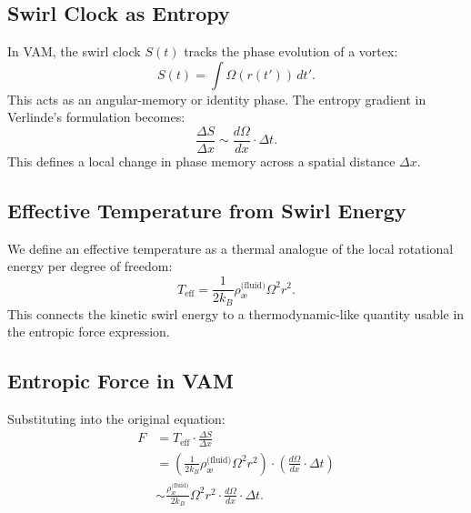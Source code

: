 \documentclass[preprint]{revtex4-2}
\begin{document}
            \subsection{Swirl Clock as Entropy}
            In VAM, the swirl clock $S(t)$ tracks the phase evolution of a vortex:
            \begin{equation}
                S(t) = \int \Omega(r(t'))\, dt'.
            \end{equation}
            This acts as an angular-memory or identity phase. The entropy gradient in Verlinde's formulation becomes:
            \begin{equation}
                \frac{\Delta S}{\Delta x} \sim \frac{d\Omega}{dx} \cdot \Delta t.
            \end{equation}
            This defines a local change in phase memory across a spatial distance $\Delta x$.

            \subsection*{Effective Temperature from Swirl Energy}
            We define an effective temperature as a thermal analogue of the local rotational energy per degree of freedom:
            \begin{equation}
                T_\text{eff} = \frac{1}{2k_B} \rho_{\text{\ae}}^{\text{(fluid)}} \Omega^2 r^2.
            \end{equation}
            This connects the kinetic swirl energy to a thermodynamic-like quantity usable in the entropic force expression.

            \subsection{Entropic Force in VAM}
            Substituting into the original equation:
            \begin{align}
                F &= T_\text{eff} \cdot \frac{\Delta S}{\Delta x} \\
                  &= \left( \frac{1}{2k_B} \rho_{\text{\ae}}^{\text{(fluid)}} \Omega^2 r^2 \right) \cdot \left( \frac{d\Omega}{dx} \cdot \Delta t \right) \\
                  &\sim \frac{\rho_{\text{\ae}}^{\text{(fluid)}}}{2k_B} \Omega^2 r^2 \cdot \frac{d\Omega}{dx} \cdot \Delta t.
            \end{align}
\end{document}
